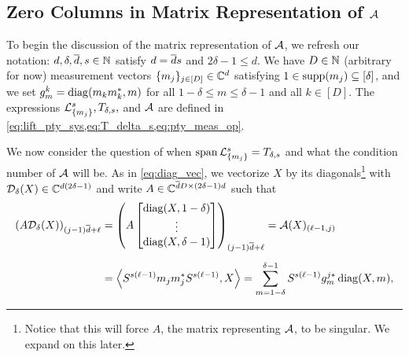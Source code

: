 \subsection{Zero Columns in Matrix Representation of $\mathcal{A}$}
\label{sec:pty_zero_col}
To begin the discussion of the matrix representation of $\mathcal{A}$, we refresh our notation: $d, \delta, \overline{d}, s \in \mathbb{N}$ satisfy $d = \overline{d} s$ and $2 \delta - 1 \le d$.  We have $D \in \mathbb{N}$ (arbitrary for now) measurement vectors $\{m_j\}_{j \in [D]} \in \mathbb{C}^d$ satisfying $1 \in \operatorname{supp}(m_j) \subseteq [\delta]$, and we set $g_m^k = \operatorname{diag}(m_k m_k^*, m)$ for all $1 - \delta \le m \le \delta - 1$ and all $k \in [D]$.  The expressions $\mathcal{L}_{\{m_j\}}^s, T_{\delta, s},$ and $\mathcal{A}$ are defined in \cref{eq:lift_pty_sys,eq:T_delta_s,eq:pty_meas_op}.

We now consider the question of when $\operatorname{span} \mathcal{L}_{\{m_j\}}^s = T_{\delta, s}$ and what the condition number of $\mathcal{A}$ will be.  As in \eqref{eq:diag_vec}, we vectorize $X$ by its diagonals\footnote{Notice that this will force $A$, the matrix representing $\mathcal{A}$, to be singular.  We expand on this later.} with $\mathcal{D}_\delta(X) \in \mathbb{C}^{d (2 \delta - 1)}$ and write $A \in \mathbb{C}^{\overline{d} D \times (2 \delta - 1) d}$ such that \begin{align*} \left(A \Dc_\delta(X) \right)_{(j-1) \dbar + \ell} &=  \left(A \colmatfl{\diag(X, 1 - \delta)}{\diag(X, \delta - 1)}\right)_{(j - 1) \dbar + \ell} = \Ac(X)_{(\ell - 1, j)} \\[.5em] &= \inner*{S^{s(\ell - 1)} m_j m_j^* S^{s (\ell - 1)}, X} = \sum_{m = 1 - \delta}^{\delta - 1} S^{s (\ell - 1)} g_m^{j*} \diag(X, m), %
\end{align*}
